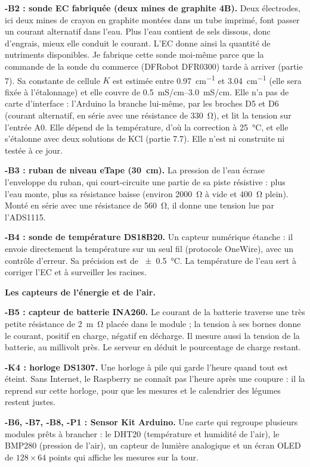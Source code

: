 \textbf{-B2 : sonde EC fabriquée (deux mines de graphite 4B).} Deux électrodes, ici deux mines de crayon en graphite montées dans un tube imprimé, font passer un courant alternatif dans l'eau. Plus l'eau contient de sels dissous, donc d'engrais, mieux elle conduit le courant. L'EC donne ainsi la quantité de nutriments disponibles. Je fabrique cette sonde moi-même parce que la commande de la sonde du commerce (DFRobot DFR0300) tarde à arriver (partie 7). Sa constante de cellule $K$ est estimée entre \qty{0,97}{cm^{-1}} et \qty{3,04}{cm^{-1}} (elle sera fixée à l'étalonnage) et elle couvre de \qtyrange{0,5}{3,0}{mS/cm}. Elle n'a pas de carte d'interface : l'Arduino la branche lui-même, par les broches D5 et D6 (courant alternatif, en série avec une résistance de \qty{330}{\ohm}), et lit la tension sur l'entrée A0. Elle dépend de la température, d'où la correction à \qty{25}{\celsius}, et elle s'étalonne avec deux solutions de KCl (partie 7.7). Elle n'est ni construite ni testée à ce jour.

\textbf{-B3 : ruban de niveau eTape (\qty{30}{cm}).} La pression de l'eau écrase l'enveloppe du ruban, qui court-circuite une partie de sa piste résistive : plus l'eau monte, plus sa résistance baisse (environ \qty{2000}{\ohm} à vide et \qty{400}{\ohm} plein). Monté en série avec une résistance de \qty{560}{\ohm}, il donne une tension lue par l'ADS1115.

\textbf{-B4 : sonde de température DS18B20.} Un capteur numérique étanche : il envoie directement la température sur un seul fil (protocole OneWire), avec un contrôle d'erreur. Sa précision est de \qty{\pm0,5}{\celsius}. La température de l'eau sert à corriger l'EC et à surveiller les racines.

\textbf{Les capteurs de l'énergie et de l'air.}

\textbf{-B5 : capteur de batterie INA260.} Le courant de la batterie traverse une très petite résistance de \qty{2}{m\ohm} placée dans le module ; la tension à ses bornes donne le courant, positif en charge, négatif en décharge. Il mesure aussi la tension de la batterie, au millivolt près. Le serveur en déduit le pourcentage de charge restant.

\textbf{-K4 : horloge DS1307.} Une horloge à pile qui garde l'heure quand tout est éteint. Sans Internet, le Raspberry ne connaît pas l'heure après une coupure : il la reprend sur cette horloge, pour que les mesures et le calendrier des légumes restent justes.

\textbf{-B6, -B7, -B8, -P1 : Sensor Kit Arduino.} Une carte qui regroupe plusieurs modules prêts à brancher : le DHT20 (température et humidité de l'air), le BMP280 (pression de l'air), un capteur de lumière analogique et un écran OLED de $128 \times 64$ points qui affiche les mesures sur la tour.

